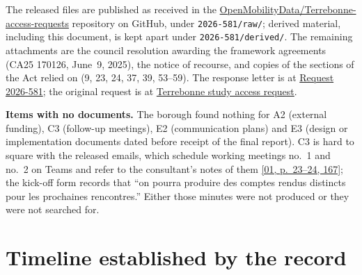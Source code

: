 \documentclass[11pt,letterpaper]{article}
\newcommand{\repourl}{https://github.com/OpenMobilityData/Terrebonne-access-requests}
\newcommand{\repo}[1]{\href{\repourl}{#1}}
\newcommand{\doc}[2]{\href{\repourl/blob/main/#1}{#2}}
\newcommand{\pagesurl}{https://openmobilitydata.github.io/Terrebonne-access-requests}
\newcommand{\pgl}[3]{\href{\pagesurl/\csname bundle#1\endcsname\#page=#2}{\textsf{\small[#1, p.~#3]}}}
\begin{document}
The released files are published as received in the \repo{OpenMobilityData/Terrebonne-access-requests} repository on GitHub, under \texttt{2026-581/raw/}; derived material, including this document, is kept apart under \texttt{2026-581/derived/}. The remaining attachments are the council resolution awarding the framework
agreements (CA25 170126, June~9, 2025), the notice of recourse, and copies
of the sections of the Act relied on (9, 23, 24, 37, 39, 53--59). The
response letter is at \doc{2026-581/raw/response_2026-10-09.pdf}{Request
2026-581}; the original request is at
\doc{2026-581/raw/request_2026-09-11.pdf}{Terrebonne study access request}.


\textbf{Items with no documents.} The borough found nothing for A2 (external
funding), C3 (follow-up meetings), E2 (communication plans) and E3 (design or
implementation documents dated before receipt of the final report). C3 is
hard to square with the released emails, which schedule working meetings
no.~1 and no.~2 on Teams and refer to the consultant's notes of them
\pgl{01}{23}{23--24, 167}; the kick-off form records that ``on pourra produire
des comptes rendus distincts pour les prochaines rencontres.'' Either those
minutes were not produced or they were not searched for.

\section{Timeline established by the record}
\end{document}
